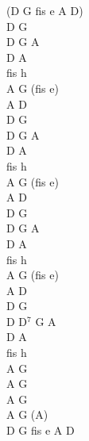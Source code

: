 \documentclass[a5paper, 10pt]{book}
\begin{document}
\begin{minipage}[t]{0.3\textwidth}
(D G fis e A D)\\
D G\\
D G A\\
D A\\
fis h\\
A G (fis e)\\
A D\\

D G\\
D G A\\
D A\\
fis h\\
A G (fis e)\\
A D\\

D G\\
D G A\\
D A\\
fis h\\
A G (fis e)\\
A D\\

D G\\
D D$^7$ G A\\
D A\\
fis h\\
A G\\
A G\\
A G\\
A G (A)\\
D G fis e A D\\
\end{minipage}

\newpage
\end{document}
